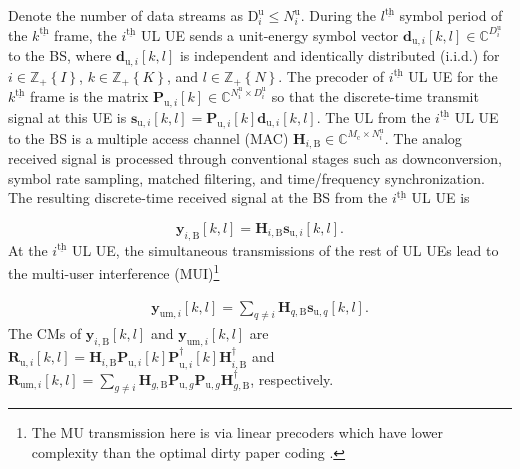 \documentclass[9pt,journal]{IEEEtran}
\newcommand{\bracket}[1]{{\left [{#1}\right ]}}
\newcommand{\braces}[1]{{\left\{ {#1}\right\}}}
\newcommand{\ith}[1]    {{#1}^{\underline{\text{th}}}}
\newcommand{\cc}{_\mathrm{c}}
\newcommand{\B}{\textrm{B}}
\newcommand{\dui}{\mathbf{d}_{\textrm{u},i}\bracket{k,l}}
\newcommand{\PiB}{\mathbf{P}_{\textrm{u},i}\bracket{k}}
\newcommand{\PiBH}{\mathbf{P}^\dagger_{\textrm{u},i}\bracket{k}}
\newcommand{\HiB}{\mathbf{H}_{i,\textrm{B}}}
\newcommand{\HiBH}{\mathbf{H}^\dagger_{i,\textrm{B}}}
\theoremstyle{definition}
\begin{document}
Denote the number of data streams as $\mathrm{D}^\textrm{u}_i\leq \mathit{N}^{\textrm{u}}_i$. During the $\ith{l}$ symbol period of the $\ith{k}$ frame, the $\ith{i}$ UL UE sends a unit-energy symbol vector $\mathbf{d}_{\textrm{u},i}\bracket{k,l}\in \mathbb{C}^{D^{\textrm{u}}_i}$ to the BS, where $\mathbf{d}_{\textrm{u},i}\bracket{k,l}$ is independent and identically distributed (i.i.d.) for $i\in\mathbb{Z}_+\braces{\mathit{I}}$, $k\in\mathbb{Z}_+\braces{\mathit{K}}$, and $l\in\mathbb{Z}_+\braces{\mathit{N}}$. 
The precoder of $\ith{i}$ UL UE for the $\ith{k}$ frame is the matrix $\PiB\in\mathbb{C}^{\mathit{N}^{\textrm{u}}_i\times \mathit{D}^\textrm{u}_i}$ so that the discrete-time transmit signal at this UE is $\mathbf{s}_{\textrm{u},i}\bracket{k,l}=\PiB\mathbf{d}_{\textrm{u},i}\bracket{k,l}$. The UL from the $\ith{i}$ UL UE to the BS is a multiple access channel (MAC) $\mathbf{H}_{i,\textrm{B}}\in\mathbb{C}^{\mathit{M}\cc\times \mathit{N}^{\textrm{u}}_i}$. The analog received signal is processed through conventional stages such as downconversion, symbol rate sampling, matched filtering, and time/frequency synchronization. The resulting discrete-time received signal at the BS from the $\ith{i}$ UL UE is\cite{Heathvehicularcommradar} \par\noindent\small
\begin{equation}
\label{eq:ULFDcomm}
\mathbf{y}_{i,\textrm{B}}\bracket{k,l}=\mathbf{H}_{i,\textrm{B}}\mathbf{s}_{\textrm{u},i}\bracket{k,l}.
\end{equation}\normalsize
At the $\ith{i}$ UL UE, the simultaneous transmissions of the rest of UL UEs lead to the multi-user interference (MUI)\footnote{The MU transmission here is via linear precoders which have lower complexity than the optimal dirty paper coding \cite{tse2005fundamentals}.}  \par\noindent\small
\begin{align}
\mathbf{y}_{\textrm{um},i}\bracket{k,l}=\sum_{q\neq i}\mathbf{H}_{q,\textrm{B}}\mathbf{s}_{\textrm{u},q}\bracket{k,l}.\label{eq:mui}
\end{align}\normalsize
The CMs of 
$\mathbf{y}_{i,\textrm{B}}\bracket{k,l}$ and $\mathbf{y}_{\textrm{um},i}\bracket{k,l}$ are  $\mathbf{R}_{\textrm{u},i}\bracket{k,l}=\HiB\PiB\PiBH\HiBH$ and
$\mathbf{R}_{\textrm{um},i}\bracket{k,l}=\sum_{g\neq i }\mathbf{H}_{g,\textrm{B}}\mathbf{P}_{\textrm{u},g}\mathbf{P}_{\textrm{u},g}\mathbf{H}^\dagger_{g,\textrm{B}}$, respectively.
\end{document}
